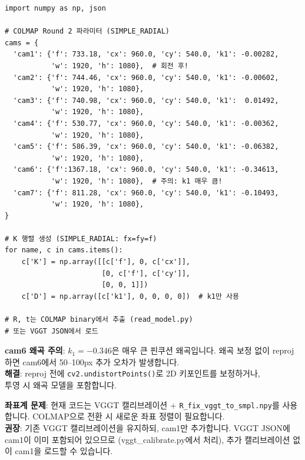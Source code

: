 \documentclass[11pt, a4paper]{report}
\begin{document}
\begin{codebox}[title={COLMAP $\to$ annots.npy 변환}]
\begin{verbatim}
import numpy as np, json

# COLMAP Round 2 파라미터 (SIMPLE_RADIAL)
cams = {
  'cam1': {'f': 733.18, 'cx': 960.0, 'cy': 540.0, 'k1': -0.00282,
           'w': 1920, 'h': 1080},  # 회전 후!
  'cam2': {'f': 744.46, 'cx': 960.0, 'cy': 540.0, 'k1': -0.00602,
           'w': 1920, 'h': 1080},
  'cam3': {'f': 740.98, 'cx': 960.0, 'cy': 540.0, 'k1':  0.01492,
           'w': 1920, 'h': 1080},
  'cam4': {'f': 530.77, 'cx': 960.0, 'cy': 540.0, 'k1': -0.00362,
           'w': 1920, 'h': 1080},
  'cam5': {'f': 586.39, 'cx': 960.0, 'cy': 540.0, 'k1': -0.06382,
           'w': 1920, 'h': 1080},
  'cam6': {'f':1367.18, 'cx': 960.0, 'cy': 540.0, 'k1': -0.34613,
           'w': 1920, 'h': 1080},  # 주의: k1 매우 큼!
  'cam7': {'f': 811.28, 'cx': 960.0, 'cy': 540.0, 'k1': -0.10493,
           'w': 1920, 'h': 1080},
}

# K 행렬 생성 (SIMPLE_RADIAL: fx=fy=f)
for name, c in cams.items():
    c['K'] = np.array([[c['f'], 0, c['cx']],
                       [0, c['f'], c['cy']],
                       [0, 0, 1]])
    c['D'] = np.array([c['k1'], 0, 0, 0, 0])  # k1만 사용

# R, t는 COLMAP binary에서 추출 (read_model.py)
# 또는 VGGT JSON에서 로드
\end{verbatim}
\end{codebox}

\begin{warningbox}
\textbf{cam6 왜곡 주의}: $k_1 = -0.346$은 매우 큰 핀쿠션 왜곡입니다.
왜곡 보정 없이 reproj하면 cam6에서 50--100px 추가 오차가 발생합니다.\\
\textbf{해결}: reproj 전에 \texttt{cv2.undistortPoints()}로 2D 키포인트를 보정하거나,\\
투영 시 왜곡 모델을 포함합니다.
\end{warningbox}

\begin{importantnote}
\textbf{좌표계 문제}: 현재 코드는 VGGT 캘리브레이션 + \texttt{R\_fix\_vggt\_to\_smpl.npy}를 사용합니다.
COLMAP으로 전환 시 새로운 좌표 정렬이 필요합니다.\\
\textbf{권장}: 기존 VGGT 캘리브레이션을 유지하되, cam1만 추가합니다.
VGGT JSON에 cam1이 이미 포함되어 있으므로 (vggt\_calibrate.py에서 처리),
추가 캘리브레이션 없이 cam1을 로드할 수 있습니다.
\end{importantnote}
\end{document}
